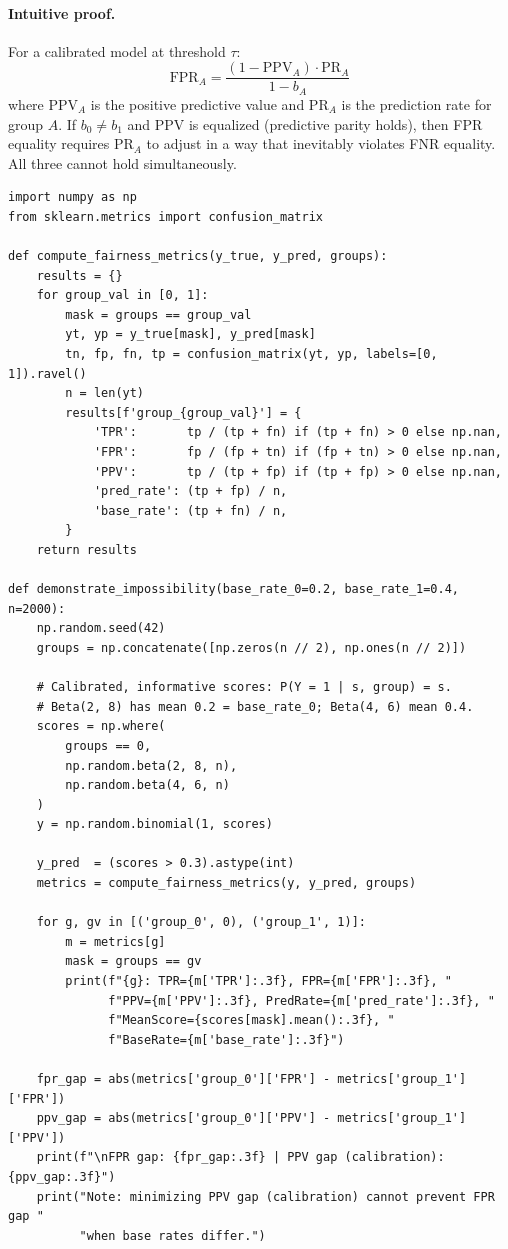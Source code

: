 \paragraph{Intuitive proof.} For a calibrated model at threshold $\tau$:
\[
\text{FPR}_A = \frac{(1-\text{PPV}_A) \cdot \text{PR}_A}{1 - b_A}
\]
where $\text{PPV}_A$ is the positive predictive value and $\text{PR}_A$ is the prediction rate for group $A$. If $b_0 \neq b_1$ and PPV is equalized (predictive parity holds), then FPR equality requires $\text{PR}_A$ to adjust in a way that inevitably violates FNR equality. All three cannot hold simultaneously.

\begin{lstlisting}[style=python, caption={Fairness impossibility demonstration}]
import numpy as np
from sklearn.metrics import confusion_matrix

def compute_fairness_metrics(y_true, y_pred, groups):
    results = {}
    for group_val in [0, 1]:
        mask = groups == group_val
        yt, yp = y_true[mask], y_pred[mask]
        tn, fp, fn, tp = confusion_matrix(yt, yp, labels=[0, 1]).ravel()
        n = len(yt)
        results[f'group_{group_val}'] = {
            'TPR':       tp / (tp + fn) if (tp + fn) > 0 else np.nan,
            'FPR':       fp / (fp + tn) if (fp + tn) > 0 else np.nan,
            'PPV':       tp / (tp + fp) if (tp + fp) > 0 else np.nan,
            'pred_rate': (tp + fp) / n,
            'base_rate': (tp + fn) / n,
        }
    return results

def demonstrate_impossibility(base_rate_0=0.2, base_rate_1=0.4, n=2000):
    np.random.seed(42)
    groups = np.concatenate([np.zeros(n // 2), np.ones(n // 2)])

    # Calibrated, informative scores: P(Y = 1 | s, group) = s.
    # Beta(2, 8) has mean 0.2 = base_rate_0; Beta(4, 6) mean 0.4.
    scores = np.where(
        groups == 0,
        np.random.beta(2, 8, n),
        np.random.beta(4, 6, n)
    )
    y = np.random.binomial(1, scores)

    y_pred  = (scores > 0.3).astype(int)
    metrics = compute_fairness_metrics(y, y_pred, groups)

    for g, gv in [('group_0', 0), ('group_1', 1)]:
        m = metrics[g]
        mask = groups == gv
        print(f"{g}: TPR={m['TPR']:.3f}, FPR={m['FPR']:.3f}, "
              f"PPV={m['PPV']:.3f}, PredRate={m['pred_rate']:.3f}, "
              f"MeanScore={scores[mask].mean():.3f}, "
              f"BaseRate={m['base_rate']:.3f}")

    fpr_gap = abs(metrics['group_0']['FPR'] - metrics['group_1']['FPR'])
    ppv_gap = abs(metrics['group_0']['PPV'] - metrics['group_1']['PPV'])
    print(f"\nFPR gap: {fpr_gap:.3f} | PPV gap (calibration): {ppv_gap:.3f}")
    print("Note: minimizing PPV gap (calibration) cannot prevent FPR gap "
          "when base rates differ.")
\end{lstlisting}

